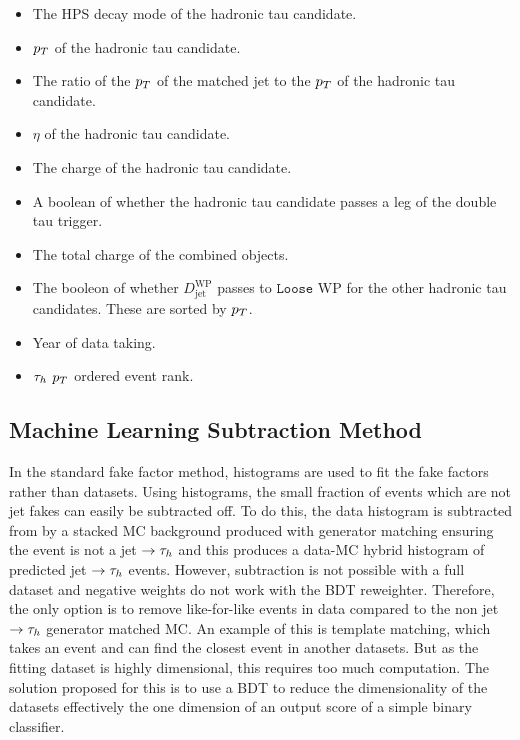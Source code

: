 \begin{itemize}
\item The HPS decay mode of the hadronic tau candidate.
\item $p_{T}$ of the hadronic tau candidate.
\item The ratio of the $p_{T}$  of the matched jet to the $p_{T}$ of the hadronic tau candidate.
\item $\eta$ of the hadronic tau candidate.
\item The charge of the hadronic tau candidate.
\item A boolean of whether the hadronic tau candidate passes a leg of the double tau trigger.
\item The total charge of the combined objects.
\item The booleon of whether $D_{\text{jet}}^{\text{WP}}$ passes to $\texttt{Loose}$ WP for the other hadronic tau candidates. These are sorted by $p_{T}$.
\item Year of data taking.
\item $\tau_{h}$ $p_{T}$ ordered event rank.
\end{itemize}

\subsection{Machine Learning Subtraction Method}

In the standard fake factor method, histograms are used to fit the fake factors rather than datasets. 
Using histograms, the small fraction of events which are not jet fakes can easily be subtracted off. 
To do this, the data histogram is subtracted from by a stacked MC background produced with generator matching ensuring the event is not a jet $\rightarrow\tau_{h}$ and this produces a data-MC hybrid histogram of predicted jet $\rightarrow\tau_{h}$ events.
However, subtraction is not possible with a full dataset and negative weights do not work with the BDT reweighter. 
Therefore, the only option is to remove like-for-like events in data compared to the non jet $\rightarrow\tau_{h}$ generator matched MC.
An example of this is template matching, which takes an event and can find the closest event in another datasets.
But as the fitting dataset is highly dimensional, this requires too much computation.
The solution proposed for this is to use a BDT to reduce the dimensionality of the datasets effectively the one dimension of an output score of a simple binary classifier. \\


